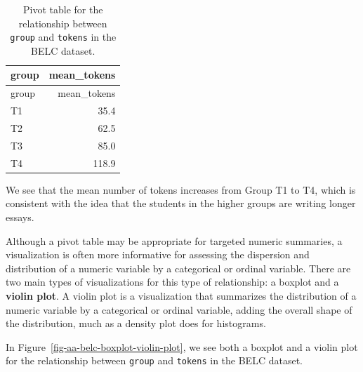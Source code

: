 \documentclass[
  letterpaper,
  DIV=11,
  numbers=noendperiod]{scrreport}
\theoremstyle{definition}
\theoremstyle{remark}
\begin{document}
\hypertarget{tbl-aa-belc-pivot-table}{}
\begin{longtable}[]{@{}lr@{}}
\caption{\label{tbl-aa-belc-pivot-table}Pivot table for the relationship
between \texttt{group} and \texttt{tokens} in the BELC
dataset.}\tabularnewline
\toprule\noalign{}
group & mean\_tokens \\
\midrule\noalign{}
\endfirsthead
\toprule\noalign{}
group & mean\_tokens \\
\midrule\noalign{}
\endhead
\bottomrule\noalign{}
\endlastfoot
T1 & 35.4 \\
T2 & 62.5 \\
T3 & 85.0 \\
T4 & 118.9 \\
\end{longtable}

We see that the mean number of tokens increases from Group T1 to T4,
which is consistent with the idea that the students in the higher groups
are writing longer essays.

Although a pivot table may be appropriate for targeted numeric
summaries, a visualization is often more informative for assessing the
dispersion and distribution of a numeric variable by a categorical or
ordinal variable. There are two main types of visualizations for this
type of relationship: a boxplot and a \textbf{violin plot}. A violin
plot is a visualization that summarizes the distribution of a numeric
variable by a categorical or ordinal variable, adding the overall shape
of the distribution, much as a density plot does for histograms.

In Figure~\ref{fig-aa-belc-boxplot-violin-plot}, we see both a boxplot
and a violin plot for the relationship between \texttt{group} and
\texttt{tokens} in the BELC dataset.
\end{document}
